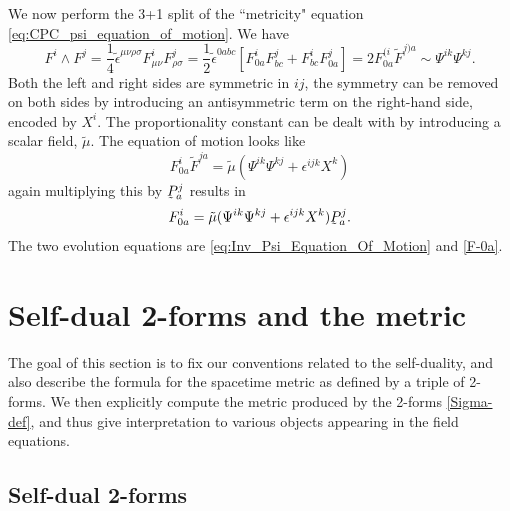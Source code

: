 \documentclass[10pt]{report}
\newcommand{\utilde}[1]{\underaccent{\tilde}{#1}}
\theoremstyle{definition}
\begin{document}
We now perform the 3+1 split of the ``metricity" equation \cref{eq:CPC_psi_equation_of_motion}. We have
\begin{equation}
    F^i \wedge F^j = \frac{1}{4}\tilde{\epsilon}^{\mu\nu\rho\sigma} F^i_{\mu\nu}F^j_{\rho\sigma} = \frac{1}{2}\tilde{\epsilon}^{0abc} \left[ F^i_{0a}F^j_{bc} + F^i_{bc} F^j_{0a} \right] = 2 F^{(i}_{0a} \tilde{F}^{j)a} \sim \Psi^{ik}\Psi^{kj}.
\end{equation}
Both the left and right sides are symmetric in $ij$, the symmetry can be removed on both sides by introducing an antisymmetric term on the right-hand side, encoded by $X^i$. The proportionality constant can be dealt with by introducing a scalar field, $\tilde{\mu}$. The equation of motion looks like
\begin{equation}
    F^i_{0a} \tilde{F}^{ja} = \tilde{\mu} \left( \Psi^{ik} \Psi^{kj} + \epsilon^{ijk} X^k \right)
\end{equation}
again multiplying this by $\utilde{P}^j_a$ results in
\begin{equation}\label{F-0a}
    F^i_{0a} = \tilde{\mu}(\Psi^{ik}\Psi^{kj} + \epsilon^{ijk}X^k)\utilde{P}^j_a.
\end{equation}
The two evolution equations are \cref{eq:Inv_Psi_Equation_Of_Motion} and \cref{F-0a}.

\section{Self-dual 2-forms and the metric} \label{sec:num-pure-con-metric}

The goal of this section is to fix our conventions related to the self-duality, and also describe the formula for the spacetime metric as defined by a triple of 2-forms. We then explicitly compute the metric produced by the 2-forms \cref{Sigma-def}, and thus give interpretation to various objects appearing in the field equations. 

\subsection{Self-dual 2-forms}
\end{document}
